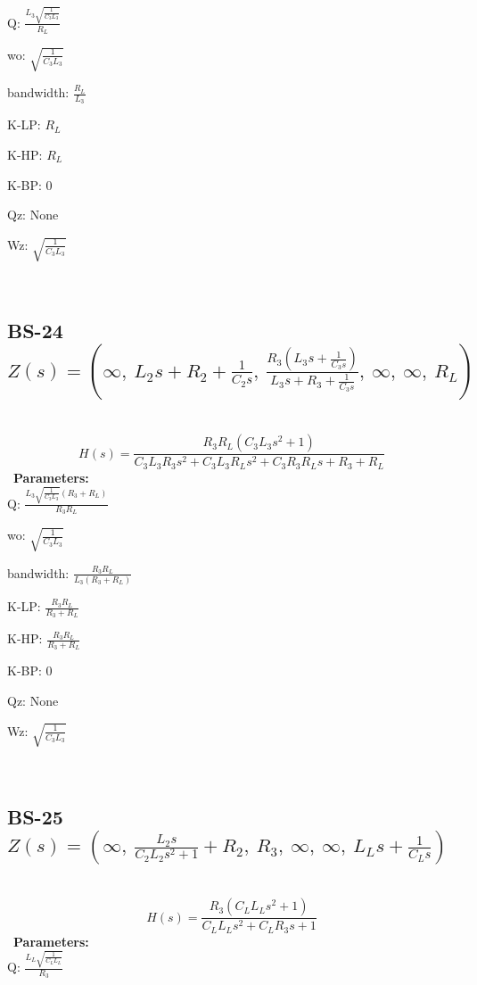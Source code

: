 \documentclass{article}
\begin{document}
Q: $\frac{L_{3} \sqrt{\frac{1}{C_{3} L_{3}}}}{R_{L}}$\ 

wo: $\sqrt{\frac{1}{C_{3} L_{3}}}$\ 

bandwidth: $\frac{R_{L}}{L_{3}}$\ 

K-LP: $R_{L}$\ 

K-HP: $R_{L}$\ 

K-BP: $0$\ 

Qz: $\text{None}$\ 

Wz: $\sqrt{\frac{1}{C_{3} L_{3}}}$\ 

\ 

\subsection{BS-24 $Z(s) = \left( \infty, \  L_{2} s + R_{2} + \frac{1}{C_{2} s}, \  \frac{R_{3} \left(L_{3} s + \frac{1}{C_{3} s}\right)}{L_{3} s + R_{3} + \frac{1}{C_{3} s}}, \  \infty, \  \infty, \  R_{L}\right)$ } \ 
\textbf{\[H(s) = \frac{R_{3} R_{L} \left(C_{3} L_{3} s^{2} + 1\right)}{C_{3} L_{3} R_{3} s^{2} + C_{3} L_{3} R_{L} s^{2} + C_{3} R_{3} R_{L} s + R_{3} + R_{L}}\] } \ 
\textbf{Parameters:}\\ 

Q: $\frac{L_{3} \sqrt{\frac{1}{C_{3} L_{3}}} \left(R_{3} + R_{L}\right)}{R_{3} R_{L}}$\ 

wo: $\sqrt{\frac{1}{C_{3} L_{3}}}$\ 

bandwidth: $\frac{R_{3} R_{L}}{L_{3} \left(R_{3} + R_{L}\right)}$\ 

K-LP: $\frac{R_{3} R_{L}}{R_{3} + R_{L}}$\ 

K-HP: $\frac{R_{3} R_{L}}{R_{3} + R_{L}}$\ 

K-BP: $0$\ 

Qz: $\text{None}$\ 

Wz: $\sqrt{\frac{1}{C_{3} L_{3}}}$\ 

\ 

\subsection{BS-25 $Z(s) = \left( \infty, \  \frac{L_{2} s}{C_{2} L_{2} s^{2} + 1} + R_{2}, \  R_{3}, \  \infty, \  \infty, \  L_{L} s + \frac{1}{C_{L} s}\right)$ } \ 
\textbf{\[H(s) = \frac{R_{3} \left(C_{L} L_{L} s^{2} + 1\right)}{C_{L} L_{L} s^{2} + C_{L} R_{3} s + 1}\] } \ 
\textbf{Parameters:}\\ 

Q: $\frac{L_{L} \sqrt{\frac{1}{C_{L} L_{L}}}}{R_{3}}$\ 
\end{document}
